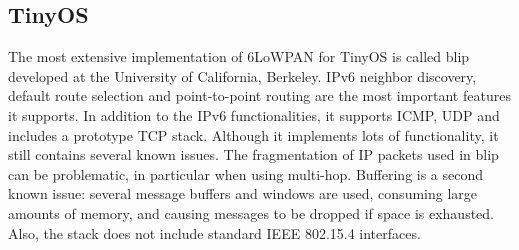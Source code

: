 \documentclass[10pt]{article}
\begin{document}
\subsection{TinyOS}
The most extensive implementation of 6LoWPAN for TinyOS is called blip developed at the University of California, Berkeley.  IPv6 neighbor discovery, default route selection and point-to-point routing are the most important features it supports. In addition to the IPv6 functionalities, it supports ICMP, UDP and includes a prototype TCP stack.  Although it implements lots of functionality, it still contains several known issues.  The fragmentation of IP packets used in blip can be problematic, in particular when using multi-hop.  Buffering is a second known issue: several message buffers and windows are used, consuming large amounts of memory, and causing messages to be dropped if space is exhausted. Also, the stack does not include standard IEEE 802.15.4 interfaces.  
\end{document}
